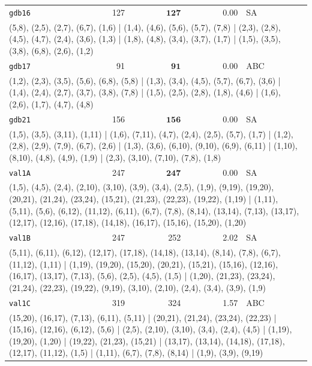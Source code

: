 \begin{longtable}{lrrrl}
\texttt{gdb16} & 127 & $\mathbf{127}$ & 0.00 & SA \\
\multicolumn{5}{p{0.96\linewidth}}{\tiny\raggedright\arraybackslash (5,8), (2,5), (2,7), (6,7), (1,6) | (1,4), (4,6), (5,6), (5,7), (7,8) | (2,3), (2,8), (4,5), (4,7), (2,4), (3,6), (1,3) | (1,8), (4,8), (3,4), (3,7), (1,7) | (1,5), (3,5), (3,8), (6,8), (2,6), (1,2)} \\[2pt]
\texttt{gdb17} & 91 & $\mathbf{91}$ & 0.00 & ABC \\
\multicolumn{5}{p{0.96\linewidth}}{\tiny\raggedright\arraybackslash (1,2), (2,3), (3,5), (5,6), (6,8), (5,8) | (1,3), (3,4), (4,5), (5,7), (6,7), (3,6) | (1,4), (2,4), (2,7), (3,7), (3,8), (7,8) | (1,5), (2,5), (2,8), (1,8), (4,6) | (1,6), (2,6), (1,7), (4,7), (4,8)} \\[2pt]
\texttt{gdb21} & 156 & $\mathbf{156}$ & 0.00 & SA \\
\multicolumn{5}{p{0.96\linewidth}}{\tiny\raggedright\arraybackslash (1,5), (3,5), (3,11), (1,11) | (1,6), (7,11), (4,7), (2,4), (2,5), (5,7), (1,7) | (1,2), (2,8), (2,9), (7,9), (6,7), (2,6) | (1,3), (3,6), (6,10), (9,10), (6,9), (6,11) | (1,10), (8,10), (4,8), (4,9), (1,9) | (2,3), (3,10), (7,10), (7,8), (1,8)} \\[2pt]
\texttt{val1A} & 247 & $\mathbf{247}$ & 0.00 & SA \\
\multicolumn{5}{p{0.96\linewidth}}{\tiny\raggedright\arraybackslash (1,5), (4,5), (2,4), (2,10), (3,10), (3,9), (3,4), (2,5), (1,9), (9,19), (19,20), (20,21), (21,24), (23,24), (15,21), (21,23), (22,23), (19,22), (1,19) | (1,11), (5,11), (5,6), (6,12), (11,12), (6,11), (6,7), (7,8), (8,14), (13,14), (7,13), (13,17), (12,17), (12,16), (17,18), (14,18), (16,17), (15,16), (15,20), (1,20)} \\[2pt]
\texttt{val1B} & 247 & 252 & 2.02 & SA \\
\multicolumn{5}{p{0.96\linewidth}}{\tiny\raggedright\arraybackslash (5,11), (6,11), (6,12), (12,17), (17,18), (14,18), (13,14), (8,14), (7,8), (6,7), (11,12), (1,11) | (1,19), (19,20), (15,20), (20,21), (15,21), (15,16), (12,16), (16,17), (13,17), (7,13), (5,6), (2,5), (4,5), (1,5) | (1,20), (21,23), (23,24), (21,24), (22,23), (19,22), (9,19), (3,10), (2,10), (2,4), (3,4), (3,9), (1,9)} \\[2pt]
\texttt{val1C} & 319 & 324 & 1.57 & ABC \\
\multicolumn{5}{p{0.96\linewidth}}{\tiny\raggedright\arraybackslash (15,20), (16,17), (7,13), (6,11), (5,11) | (20,21), (21,24), (23,24), (22,23) | (15,16), (12,16), (6,12), (5,6) | (2,5), (2,10), (3,10), (3,4), (2,4), (4,5) | (1,19), (19,20), (1,20) | (19,22), (21,23), (15,21) | (13,17), (13,14), (14,18), (17,18), (12,17), (11,12), (1,5) | (1,11), (6,7), (7,8), (8,14) | (1,9), (3,9), (9,19)} \\[2pt]

\end{longtable}
